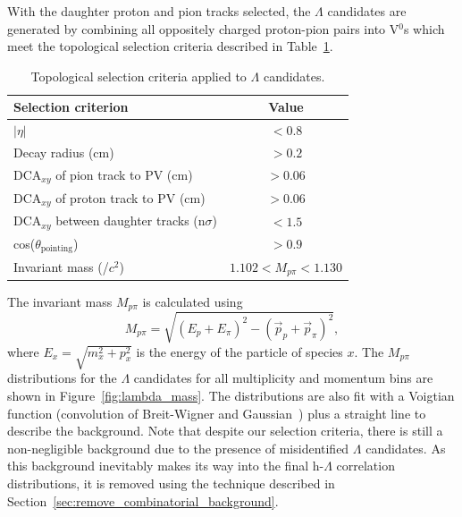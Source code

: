 With the daughter proton and pion tracks selected, the $\Lambda$ candidates are generated by combining all oppositely charged proton-pion pairs into V$^0$s which meet the topological selection criteria described in Table~\ref{tab:lambda_selection}. 

\begin{table}[h!]
	\centering
	\caption{Topological selection criteria applied to $\Lambda$ candidates.}
	\label{tab:lambda_selection}
	\begin{tabular}{l c}
		\hline
		Selection criterion & Value \\
		\hline
		$|\eta|$ & $< 0.8$ \\
		Decay radius (cm) & $> 0.2$ \\
		DCA$_{xy}$ of pion track to PV (cm) & $> 0.06$ \\
		DCA$_{xy}$ of proton track to PV (cm) & $> 0.06$ \\
		DCA$_{xy}$ between daughter tracks (n$\sigma$) & $< 1.5$ \\
		cos($\theta_{\text{pointing}}$) & $> 0.9$ \\
		Invariant mass (\GeV/$c^2$) & $1.102 < M_{p\pi} < 1.130$ \\
		\hline
	\end{tabular}
\end{table}

\noindent The invariant mass $M_{p\pi}$ is calculated using
%
\begin{equation}
	M_{p\pi} = \sqrt{(E_{p} + E_{\pi})^2 - (\vec{p}_{p} + \vec{p}_{\pi})^2},
\end{equation}
%
where $E_{x} = \sqrt{m_{x}^2 + p_{x}^2}$ is the energy of the particle of species $x$. The $M_{p\pi}$ distributions for the $\Lambda$ candidates for all multiplicity and momentum bins are shown in Figure~\ref{fig:lambda_mass}. The distributions are also fit with a Voigtian function (convolution of Breit-Wigner and Gaussian~\cite{Voigt}) plus a straight line to describe the background. Note that despite our selection criteria, there is still a non-negligible background due to the presence of misidentified $\Lambda$ candidates. As this background inevitably makes its way into the final h-$\Lambda$ correlation distributions, it is removed using the technique described in Section~\ref{sec:remove_combinatorial_background}. 



